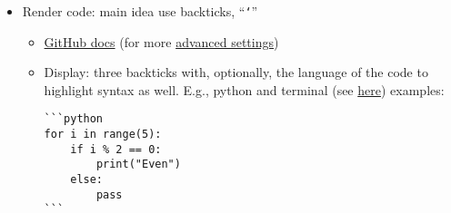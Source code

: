 \documentclass[a4paper,12pt,%
              final%
              ]{article}
\begin{document}
\begin{itemize}
  \item Render code: main idea use backticks, ``\texttt{`}''
    \begin{itemize}
      \item \href{https://docs.github.com/en/get-started/writing-on-github/getting-started-with-writing-and-formatting-on-github/basic-writing-and-formatting-syntax#quoting-code}{GitHub docs}
        (for more \href{https://docs.github.com/en/get-started/writing-on-github/working-with-advanced-formatting/creating-and-highlighting-code-blocks}{advanced settings})
      \item Display: three backticks with, optionally, the language of the code to highlight syntax as well. E.g., python and terminal (see \href{https://stackoverflow.com/a/49004070/12152457}{here}) examples:
\begin{verbatim}
```python
for i in range(5):
    if i % 2 == 0:
        print("Even")
    else:
        pass
```


\end{verbatim}
\end{itemize}
\end{itemize}
\end{document}
